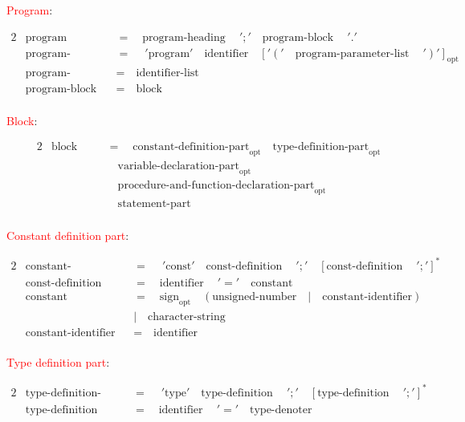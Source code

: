 \documentclass{article}
\begin{document}
\textcolor{red}{Program}:

\begin{alignat*}{2}
&\text{program}\quad&&=\quad\text{program-heading}\quad\ ';'\quad \text{program-block}\quad\ '.'\\
&\text{program-heading}\quad&&=\quad\ '\text{program}'\quad \text{identifier}\quad {['('\quad\text{program-parameter-list}\quad\ ')']}_\text{opt}\\
&\text{program-parameter-list}\quad&&=\quad\text{identifier-list}\\
&\text{program-block}\quad&&=\quad\text{block}\\
\end{alignat*}

\textcolor{red}{Block}:

\begin{alignat*}{2}
&\text{block}\quad&&=\quad\text{constant-definition-part}_\text{opt}\quad\text{type-definition-part}_\text{opt}\\
&&&\quad\text{variable-declaration-part}_\text{opt}\\
&&&\quad\text{procedure-and-function-declaration-part}_\text{opt}\\
&&&\quad\text{statement-part}\\
\end{alignat*}

\textcolor{red}{Constant definition part}:

\begin{alignat*}{2}
&\text{constant-definition-part}\quad&&=\quad\ '\text{const}'\quad\text{const-definition}\quad\ ';'\quad {[\text{const-definition}\quad\ ';']}^* \\
&\text{const-definition}\quad&&=\quad\text{identifier}\quad\ '=' \quad\text{constant}\\
&\text{constant}\quad&&=\quad\text{sign}_\text{opt}\quad(\text{unsigned-number}\quad |\quad \text{constant-identifier})\\
&&&|\quad\text{character-string}\\
&\text{constant-identifier}\quad&&=\quad\text{identifier}\\
\end{alignat*}

\textcolor{red}{Type definition part}:

\begin{alignat*}{2}
&\text{type-definition-part}\quad&&=\quad\ '\text{type}'\quad\text{type-definition}\quad\ ';'\quad {[\text{type-definition}\quad\ ';']}^*\\
&\text{type-definition}\quad&&=\quad\text{identifier}\quad\ '='\quad\text{type-denoter}\\
\end{alignat*}
\end{document}
